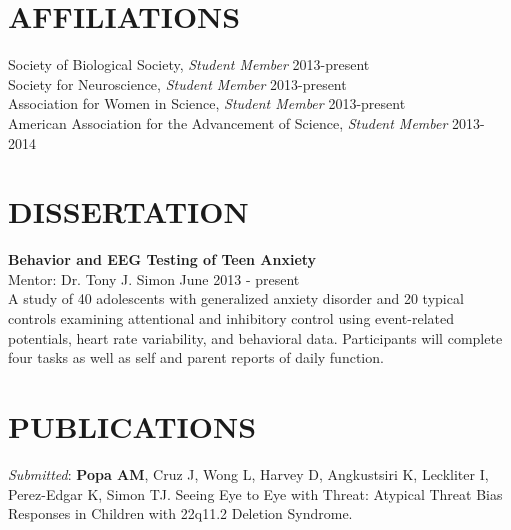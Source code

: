 \documentclass[line,margin,10pt]{res}
\begin{document}
\begin{resume}
\section{AFFILIATIONS}
Society of Biological Society, \textit{Student Member} \hfill 2013-present\\
Society for Neuroscience, \textit{Student Member} \hfill 2013-present\\
Association for Women in Science, \textit{Student Member} \hfill 2013-present\\
American Association for the Advancement of Science, \textit{Student Member} \hfill 2013-2014
                

\section{DISSERTATION}
\textbf{Behavior and EEG Testing of Teen Anxiety}\\
Mentor: Dr. Tony J. Simon \hfill June 2013 - present\\
A study of 40 adolescents with generalized anxiety disorder and 20 typical controls examining attentional and inhibitory control using event-related potentials, heart rate variability, and behavioral data. Participants will complete four tasks as well as self and parent reports of daily function.


\section{PUBLICATIONS}
{\sl Submitted}: \textbf{Popa AM}, Cruz J, Wong L, Harvey D, Angkustsiri K, Leckliter I, Perez-Edgar K, Simon TJ. Seeing Eye to Eye with Threat: Atypical Threat Bias Responses in Children with 22q11.2 Deletion Syndrome.


\end{resume}
\end{document}
